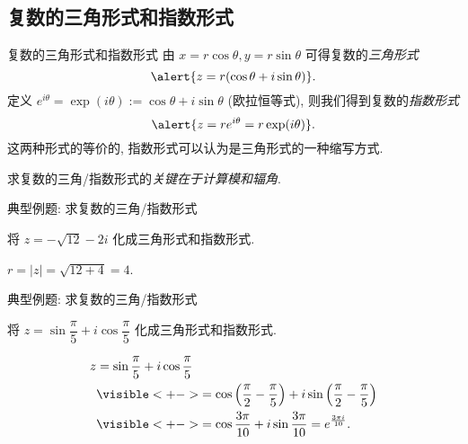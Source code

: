 \subsection{复数的三角形式和指数形式}
\begin{frame}{复数的三角形式和指数形式}
	\onslide<+->
	由 $x=r\cos\theta,y=r\sin\theta$ 可得复数的\emph{三角形式}
	\[\alert{z=r(\cos\theta+i\sin\theta)}.\]
	\onslide<+->
	定义 $e^{i\theta}=\exp(i\theta):=\cos\theta+i\sin\theta$ (欧拉恒等式),
	\onslide<+->
	则我们得到复数的\emph{指数形式}
	\[\alert{z=re^{i\theta}=r\exp(i\theta)}.\]
	\onslide<+->
	这两种形式的等价的, 指数形式可以认为是三角形式的一种缩写方式.

	\onslide<+->
	求复数的三角/指数形式的\emph{关键在于计算模和辐角}.
\end{frame}


\begin{frame}{典型例题: 求复数的三角/指数形式}
	\onslide<+->
	\begin{example}
		将 $z=-\sqrt{12}-2i$ 化成三角形式和指数形式.
	\end{example}

	\onslide<+->
	\begin{solution}
		$r=|z|=\sqrt{12+4}=4$.
		\onslide<+->{故
			\[z=4\left[\cos\left(-\frac{5\pi}6\right)+i\sin\left(-
		\frac{5\pi}6\right)\right]=4e^{-\frac{5\pi i}6}.\]}
	\end{solution}
\end{frame}


\begin{frame}{典型例题: 求复数的三角/指数形式}
	\onslide<+->
	\begin{example}
		将 $z=\sin\dfrac\pi5+i\cos\dfrac\pi5$ 化成三角形式和指数形式.
	\end{example}

	\onslide<+->
	\begin{solution}
		\vspace{-\baselineskip}
		\begin{align*}
		z&=\sin\frac\pi5+i\cos\frac\pi5\\
		&\visible<+->{=\cos\left(\frac\pi2-\frac\pi5\right)+i\sin\left(\frac\pi2-\frac\pi5\right)}\\
		&\visible<+->{=\cos\frac{3\pi}{10}+i\sin\frac{3\pi}{10}=e^{\frac{3\pi i}{10}}.}
		\end{align*}
	\end{solution}
\end{frame}



